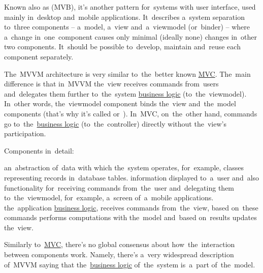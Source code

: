 \label{mvvm}
Known also as  (MVB), it's another pattern for~systems with user interface, used mainly in~desktop and~mobile applications.
It~describes a~system separation to~three components -- a~model, a~view and~a~viewmodel (or~binder) -- where a~change in~one~component causes only minimal (ideally none) changes in~other two components.
It~should be possible to~develop, maintain and~reuse each component separately.

The~MVVM architecture is very similar to~the~better known \hyperref[mvc]{MVC}.
The~main difference is that in~MVVM the~view receives commands from~users and~delegates them further to~the~system \hyperref[businesslogic]{business logic} (to~the~viewmodel).
In~other words, the~viewmodel component binds the~view and~the~model components (that's why it's called  or~).
In~MVC, on~the~other hand, commands go to~the~\hyperref[businesslogic]{business logic} (to~the~controller) directly without the~view's participation.
\newline

\noindent Components in~detail:
\begin{itemize}
     an~abstraction of~data with which the~system operates, for~example, classes representing records in~database tables.
     information displayed to~a~user and~also functionality for~receiving commands from~the~user and~delegating them to~the~viewmodel, for~example, a~screen of~a~mobile applications.
     the~application \hyperref[businesslogic]{business logic}, receives commands from~the~view, based on~these commands performs computations with the~model and~based on~results updates the~view.
\end{itemize}

\warning Similarly to~\hyperref[mvc]{MVC}, there's no global consensus about how~the~interaction between components work.
Namely, there's a~very widespread description of~MVVM saying that the~\hyperref[businesslogic]{business logic} of~the~system is~a~part of~the~model.

